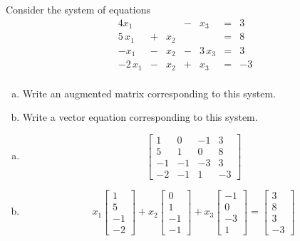 
\begin{exerciseStatement}


 Consider the system of equations 
\begin{alignat*}{4} x_{1} & &  &-& x_{3} &=& 3 \\5 \, x_{1} &+& x_{2} & &  &=& 8 \\-x_{1} &-& x_{2} &-& 3 \, x_{3} &=& 3 \\-2 \, x_{1} &-& x_{2} &+& x_{3} &=& -3 \\ \end{alignat*}
            


\begin{enumerate}[(a)]
\item  Write an augmented matrix corresponding to this system. 
\item  Write a vector equation corresponding to this system. 
\end{enumerate}
    
\end{exerciseStatement}
    
\begin{exerciseAnswer} 

\begin{enumerate}[(a)]
\item \[ \left[\begin{array}{ccc|c}
1 & 0 & -1 & 3 \\
5 & 1 & 0 & 8 \\
-1 & -1 & -3 & 3 \\
-2 & -1 & 1 & -3
\end{array}\right] \]
\item \[ x_{1} \left[\begin{array}{c}
1 \\
5 \\
-1 \\
-2
\end{array}\right] + x_{2} \left[\begin{array}{c}
0 \\
1 \\
-1 \\
-1
\end{array}\right] + x_{3} \left[\begin{array}{c}
-1 \\
0 \\
-3 \\
1
\end{array}\right] = \left[\begin{array}{c}
3 \\
8 \\
3 \\
-3
\end{array}\right] \]
\end{enumerate}
    
\end{exerciseAnswer}
    

